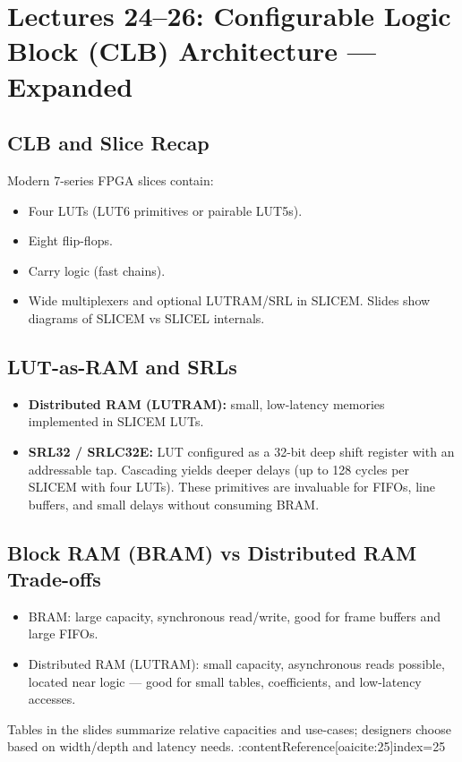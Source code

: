 \documentclass[11pt]{article}
\begin{document}
\newpage

\section{Lectures 24--26: Configurable Logic Block (CLB) Architecture — Expanded}

\subsection{CLB and Slice Recap}
Modern 7-series FPGA slices contain:
\begin{itemize}
  \item Four LUTs (LUT6 primitives or pairable LUT5s).
  \item Eight flip-flops.
  \item Carry logic (fast chains).
  \item Wide multiplexers and optional LUTRAM/SRL in SLICEM. Slides show diagrams of SLICEM vs SLICEL internals. 
\end{itemize}

\subsection{LUT-as-RAM and SRLs}
\begin{itemize}
  \item \textbf{Distributed RAM (LUTRAM):} small, low-latency memories implemented in SLICEM LUTs.
  \item \textbf{SRL32 / SRLC32E:} LUT configured as a 32-bit deep shift register with an addressable tap. Cascading yields deeper delays (up to 128 cycles per SLICEM with four LUTs). These primitives are invaluable for FIFOs, line buffers, and small delays without consuming BRAM. 
\end{itemize}

\subsection{Block RAM (BRAM) vs Distributed RAM Trade-offs}
\begin{itemize}
  \item BRAM: large capacity, synchronous read/write, good for frame buffers and large FIFOs.
  \item Distributed RAM (LUTRAM): small capacity, asynchronous reads possible, located near logic — good for small tables, coefficients, and low-latency accesses.
\end{itemize}
Tables in the slides summarize relative capacities and use-cases; designers choose based on width/depth and latency needs. :contentReference[oaicite:25]{index=25}
\end{document}
